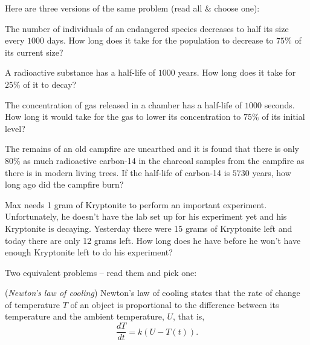 \begin{multicols}{2}









\problem Here are three versions of the same problem (read all \& choose one): %

\subprob The number of individuals of an endangered species decreases to half
its size every $1000$ days.  How long does it take for the population to
decrease to $75\%$ of its current size?

\subprob A radioactive substance has a half-life of $1000$ years.  How long does
it take for $25\%$ of it to decay?

\subprob The concentration of gas released in a chamber has a half-life of
$1000$ seconds. How long it would take for the gas to lower its concentration to
$75\%$ of its initial level?

\problem The remains of an old campfire are unearthed and it is found that there %
is only $80\%$ as much radioactive carbon-14 in the charcoal samples from the
campfire as there is in modern living trees.  If the half-life of carbon-14 is
$5730$ years, how long ago did the campfire burn?


\problem Max needs 1 gram of Kryptonite to perform an important experiment. %
Unfortunately, he doesn't have the lab set up for his experiment yet and his
Kryptonite is decaying.  Yesterday there were 15 grams of Kryptonite left and
today there are only 12 grams left.  How long does he have before he won't
have enough Kryptonite left to do his experiment?

\problem Two equivalent problems -- read them and pick one: %



\subprob ({\it Newton's law of cooling})
Newton's law of cooling states that the rate of change of temperature $T$
of an object is proportional to the difference between its temperature
and the ambient temperature, $U$, that is,
\[
  \frac{dT}{dt}=k\left(U-T(t)\right).
\]





\end{multicols}
